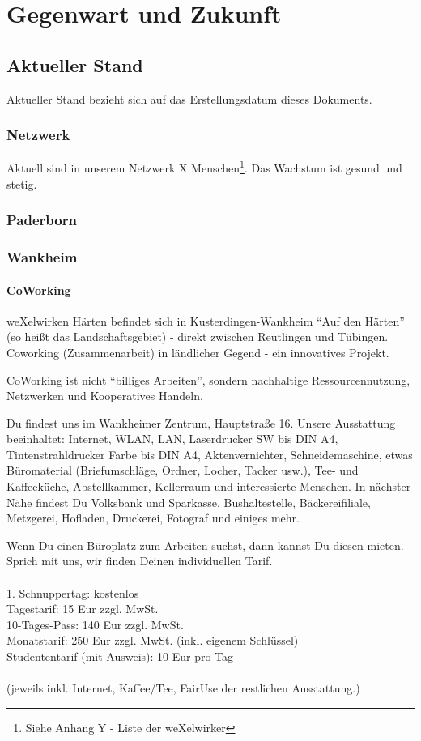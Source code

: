 
\chapter{Gegenwart und Zukunft}
  \section{Aktueller Stand}
Aktueller Stand bezieht sich auf das Erstellungsdatum dieses Dokuments.
    \subsection{Netzwerk}
Aktuell sind in unserem Netzwerk X Menschen\footnote{Siehe Anhang Y - Liste der weXelwirker}. Das Wachstum ist gesund und stetig.
    \subsection{Paderborn}
    \subsection{Wankheim}
      \subsubsection{CoWorking}
weXelwirken Härten befindet sich in Kusterdingen-Wankheim "`Auf den Härten"' (so heißt das Landschaftsgebiet) - direkt zwischen Reutlingen und Tübingen.
%
Coworking (Zusammenarbeit) in ländlicher Gegend - ein innovatives Projekt.



CoWorking ist nicht "`billiges Arbeiten"', sondern nachhaltige Ressourcennutzung, Netzwerken und Kooperatives Handeln.




Du findest uns im Wankheimer Zentrum, Hauptstraße 16.
Unsere Ausstattung beeinhaltet: Internet, WLAN, LAN, Laserdrucker SW bis DIN A4, Tintenstrahldrucker Farbe bis DIN A4, Aktenvernichter, Schneidemaschine, etwas Büromaterial (Briefumschläge, Ordner, Locher, Tacker usw.), Tee- und Kaffeeküche, Abstellkammer, Kellerraum und interessierte Menschen.
%
In nächster Nähe findest Du Volksbank und Sparkasse, Bushaltestelle, Bäckereifiliale, Metzgerei, Hofladen, Druckerei, Fotograf und einiges mehr.



Wenn Du einen Büroplatz zum Arbeiten suchst, dann kannst Du diesen mieten.
Sprich mit uns, wir finden Deinen individuellen Tarif.\\
\\
    1. Schnuppertag: kostenlos\\
    Tagestarif: 15 Eur zzgl. MwSt.\\ 
    10-Tages-Pass: 140 Eur zzgl. MwSt.\\
    Monatstarif: 250 Eur zzgl. MwSt. (inkl. eigenem Schlüssel)\\
    Studententarif (mit Ausweis): 10 Eur pro Tag\\
\\
(jeweils inkl. Internet, Kaffee/Tee, FairUse der restlichen Ausstattung.)\\

